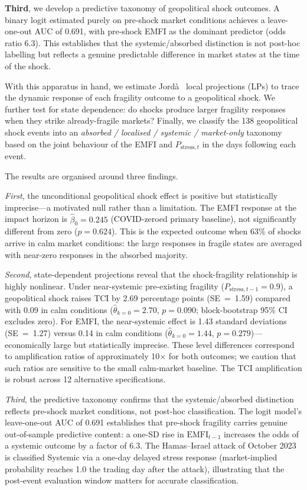 \documentclass[11pt]{article}
\begin{document}
\textbf{Third}, we develop a predictive taxonomy of geopolitical shock
outcomes. A binary logit estimated purely on pre-shock market conditions
achieves a leave-one-out AUC of 0.691, with pre-shock EMFI as the
dominant predictor (odds ratio 6.3). This establishes that the
systemic/absorbed distinction is not post-hoc labelling but reflects a
genuine predictable difference in market states at the time of the shock.

With this apparatus in hand, we estimate Jord\`a~\citeyearpar{jorda2005} local
projections (LPs) to trace the dynamic response of each fragility outcome to a
geopolitical shock.
We further test for state dependence: do shocks produce larger fragility
responses when they strike already-fragile markets?
Finally, we classify the 138 geopolitical shock events into an
\emph{absorbed / localised / systemic / market-only} taxonomy based on the
joint behaviour of the EMFI and $P_{\text{stress},t}$ in the days following
each event.

The results are organised around three findings.

\emph{First}, the unconditional geopolitical shock effect is positive but
statistically imprecise---a motivated null rather than a limitation.
The EMFI response at the impact horizon is $\hat\beta_0 = 0.245$
(COVID-zeroed primary baseline), not significantly different from zero ($p = 0.624$).
This is the expected outcome when 63\% of shocks arrive in calm market
conditions: the large responses in fragile states are averaged with
near-zero responses in the absorbed majority.

\emph{Second}, state-dependent projections reveal that the shock-fragility
relationship is highly nonlinear. Under near-systemic pre-existing fragility
($P_{\mathrm{stress},t-1} = 0.9$), a geopolitical shock raises TCI by
2.69 percentage points (SE~=~1.59) compared with 0.09 in calm conditions
($\hat\theta_{k=0} = 2.70$, $p = 0.090$; block-bootstrap 95\% CI excludes
zero). For EMFI, the near-systemic effect is 1.43 standard deviations (SE~=~1.27)
versus 0.14 in calm conditions ($\hat\theta_{k=0} = 1.44$, $p = 0.279$)---
economically large but statistically imprecise. These level differences
correspond to amplification ratios of approximately 10$\times$ for both
outcomes; we caution that such ratios are sensitive to the small
calm-market baseline. The TCI amplification is robust across 12 alternative
specifications.

\emph{Third}, the predictive taxonomy confirms that the systemic/absorbed
distinction reflects pre-shock market conditions, not post-hoc
classification. The logit model's leave-one-out AUC of 0.691 establishes
that pre-shock fragility carries genuine out-of-sample predictive content:
a one-SD rise in $\mathrm{EMFI}_{t-1}$ increases the odds of a systemic
outcome by a factor of 6.3. The Hamas--Israel attack of October 2023 is
classified Systemic via a one-day delayed stress response (market-implied
probability reaches 1.0 the trading day after the attack), illustrating that
the post-event evaluation window matters for accurate classification.
\end{document}
